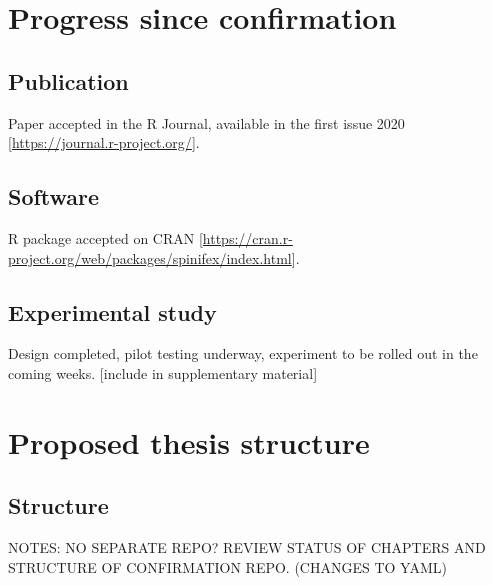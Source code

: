 \documentclass[11,]{article}
\begin{document}
\hypertarget{progress-since-confirmation}{%
\section{Progress since confirmation}\label{progress-since-confirmation}}

\hypertarget{publication}{%
\subsection{Publication}\label{publication}}

Paper accepted in the R Journal, available in the first issue 2020 {[}\url{https://journal.r-project.org/}{]}.

\hypertarget{software}{%
\subsection{Software}\label{software}}

R package accepted on CRAN {[}\url{https://cran.r-project.org/web/packages/spinifex/index.html}{]}.

\hypertarget{experimental-study}{%
\subsection{Experimental study}\label{experimental-study}}

Design completed, pilot testing underway, experiment to be rolled out in the coming weeks.
{[}include in supplementary material{]}

\hypertarget{proposed-thesis-structure}{%
\section{Proposed thesis structure}\label{proposed-thesis-structure}}

\hypertarget{structure}{%
\subsection{Structure}\label{structure}}

NOTES: NO SEPARATE REPO? REVIEW STATUS OF CHAPTERS AND STRUCTURE OF CONFIRMATION REPO. (CHANGES TO YAML)
\end{document}
